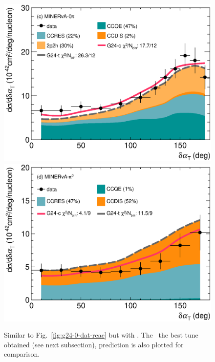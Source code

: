 \begin{figure}
        \includegraphics[width=\dbfigwid\textwidth]{figures/tuning/0013-min_0pi_dalphat_reac_decomp.eps}
        \includegraphics[width=\dbfigwid\textwidth]{figures/tuning/0013-min_pi0_dalphat_reac_decomp.eps}
        \caption{\label{fig:g24-t-dat-reac} 
        Similar to Fig.~\ref{fig:g24-0-dat-reac} but with \gT.  The \gC\, the best tune obtained (see next subsection), prediction is also plotted for comparison. 
        } 


\end{figure}
